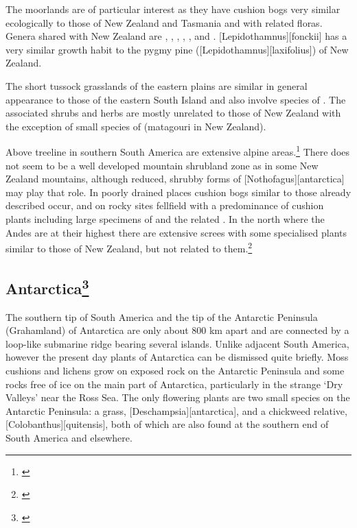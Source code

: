 The moorlands are of particular interest as they have cushion bogs very similar ecologically to those of New Zealand and Tasmania and with related floras.
Genera shared with New Zealand are , , , , ,  and . [Lepidothamnus][fonckii] has a very similar growth habit to the pygmy pine ([Lepidothamnus][laxifolius]) of New Zealand.

The short tussock grasslands of the eastern plains are similar in general appearance to those of the eastern South Island and also involve species of .
The associated shrubs and herbs are mostly unrelated to those of New Zealand with the exception of small species of  (matagouri in New Zealand).

Above treeline in southern South America are extensive alpine areas.\footnote{\cite{moore1975alpine}}
There does not seem to be a well developed mountain shrubland zone as in some New Zealand mountains, although reduced, shrubby forms of [Nothofagus][antarctica] may play that role.
In poorly drained places cushion bogs similar to those already described occur, and on rocky sites fellfield with a predominance of cushion plants including large specimens of  and the related .
In the north where the Andes are at their highest there are extensive screes with some specialised plants similar to those of New Zealand, but not related to them.\footnote{\cite{goodspeed1950plant}}

\subsection[Antarctica]{Antarctica\footnote{\cite{wace1965vascular}}}

The southern tip of South America and the tip of the Antarctic Peninsula (Grahamland) of Antarctica are only about 800 km apart and are connected by a loop-like submarine ridge bearing several islands.
Unlike adjacent South America, however the present day plants of Antarctica can be dismissed quite briefly.
Moss cushions and lichens grow on exposed rock on the Antarctic Peninsula and some rocks free of ice on the main part of Antarctica, particularly in the strange `Dry Valleys' near the Ross Sea.
The only flowering plants are two small species on the Antarctic Peninsula: a grass, [Deschampsia][antarctica], and a chickweed relative, [Colobanthus][quitensis], both of which are also found at the southern end of South America and elsewhere.

